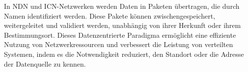 In NDN und ICN-Netzwerken werden Daten in Paketen übertragen, die durch Namen identifiziert werden. Diese Pakete können zwischengespeichert, weitergeleitet und validiert werden, unabhängig von ihrer Herkunft oder ihrem Bestimmungsort. Dieses Datenzentrierte Paradigma ermöglicht eine effiziente Nutzung von Netzwerkressourcen und verbessert die Leistung von verteilten Systemen, indem es die Notwendigkeit reduziert, den Standort oder die Adresse der Datenquelle zu kennen.